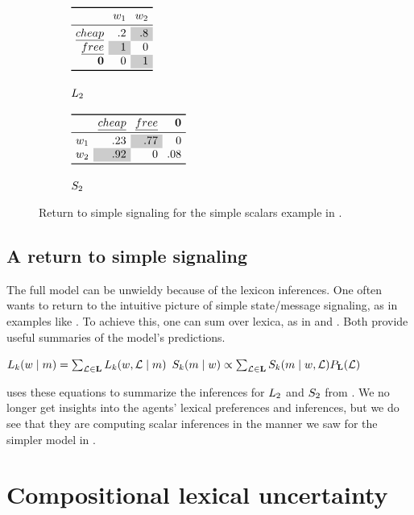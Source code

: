 \documentclass[12pt,twoside]{article}
\renewcommand{\_}{\textbf{\textunderscore\hspace{-4pt}\textunderscore\hspace{-3pt}\textunderscore\hspace{-4pt}\textunderscore}\hspace{0.5pt}}			%
\begin{document}
\begin{figure}[tp]
  \centering
  \renewcommand{\arraystretch}{0.85}
  \begin{subfigure}[b]{0.4\textwidth}
    \centering
    $\examplelistener{.2 & \graycell{.8}}{\graycell{1} & 0}{0 & \graycell{1}}$
    \caption{$\ListenerK[2]$}
  \end{subfigure}
  \qquad
  \begin{subfigure}[b]{0.4\textwidth}
    \centering
    $\examplespeaker{.23 & \graycell{.77} & 0}{\graycell{.92} & 0 & .08}$
    \caption{$\SpeakerK[2]$}
  \end{subfigure}
  \caption{Return to simple signaling for the simple scalars example
    in .}
  \label{fig:marginalized}
\end{figure}


\subsection{A return to simple signaling}\label{sec:return}

The full model can be unwieldy because of the lexicon inferences.  One
often wants to return to the intuitive picture of simple state/message
signaling, as in examples like . To achieve this,
one can sum over lexica, as in  and . Both
provide useful summaries of the model's predictions.
%
\begin{exe}
\ex\label{lisnorm} $\ListenerK(\state \given \msg)  = \sum_{\Lex \in \LexSet} \ListenerK(\state, \Lex \given \msg)$
\ex\label{spknorm} $\SpeakerK(\msg \given \state) \propto \sum_{\Lex \in \LexSet} \SpeakerK(\msg \given \state, \Lex) \LexPrior(\Lex)$
\end{exe}
%
 uses these equations to summarize the
inferences for $\ListenerK[2]$ and $\SpeakerK[2]$ from
. We no longer get insights into the
agents' lexical preferences and inferences, but we do see that they
are computing scalar inferences in the manner we saw for the simpler
model in .


\section{Compositional lexical uncertainty}\label{sec:composition}
\end{document}
